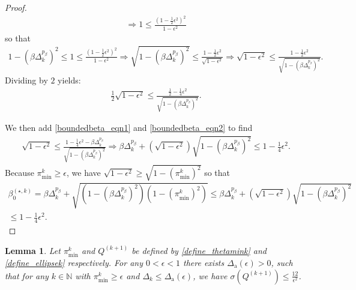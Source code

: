 \documentclass{article}
\newtheorem{lemma}[theorem]{Lemma}
\theoremstyle{case}
\numberwithin{theorem}{subsection}
\newcommand{\bsk}{{\beta_0^{(\star, k)}}}
\newcommand{\dacco}{{\Delta_{\textrm{a}}}}
\newcommand{\dk}{\Delta_k}
\newcommand{\naturals}{\mathbb N}
\newcommand{\thetamink}{{\pi^k_{\textrm{min}}}}
\newcommand{\qkpo}{{Q^{(k+1)}}}
\begin{document}
\begin{proof}
\begin{align*}
\Longrightarrow 1 \le \frac{\left(1 - \frac 1 2 \epsilon^2\right)^2}{1 - \epsilon^2}
\end{align*}
so that
\begin{align*}
1 - \left(\beta\dk^{p_{\beta}}\right)^2 \le 1 \le \frac{\left(1 - \frac 1 2 \epsilon^2\right)^2}{1 - \epsilon^2} 
\Longrightarrow \sqrt{1 - \left(\beta\dk^{p_{\beta}}\right)^2}\le \frac{1 - \frac 1 2 \epsilon^2}{\sqrt{1 - \epsilon^2} } 
\Longrightarrow \sqrt{1 - \epsilon^2} \le \frac{1 - \frac 1 2 \epsilon^2}{\sqrt{1 - \left(\beta\dk^{p_{\beta}}\right)^2}}.
\end{align*}
Dividing by $2$ yields:
\begin{align}
\frac 1 2 \sqrt{1 - \epsilon^2} \le \frac{\frac 1 2 - \frac 1 4 \epsilon^2}{\sqrt{1 - \left(\beta\dk^{p_{\beta}}\right)^2}}
\label{boundedbeta_eqn2}.
\end{align}

We then add \cref{boundedbeta_eqn1} and \cref{boundedbeta_eqn2} to find
\begin{align*}
\sqrt{1 - \epsilon^2} \le \frac{1 -  \frac 1 4 \epsilon^2 - \beta\dk^{p_{\beta}}}{\sqrt{1 - \left(\beta\dk^{p_{\beta}}\right)^2}}
\Longrightarrow \beta\dk^{p_{\beta}} + \left(\sqrt{1 - \epsilon^2}\right)\sqrt{1 - \left(\beta\dk^{p_{\beta}}\right)^2} \le 1 -  \frac 1 4 \epsilon^2.
\end{align*}
Because $\thetamink \ge \epsilon$, we have $\sqrt{1 - \epsilon^2} \ge \sqrt{1 - \left(\thetamink\right)^2}$
so that
\begin{align*}
\bsk 
= \beta\dk^{p_{\beta}} + \sqrt{\left(1 - \left(\beta\dk^{p_{\beta}}\right)^2\right)\left(1 - \left(\thetamink\right)^2\right)} 
\le \beta\dk^{p_{\beta}} + \left(\sqrt{1 - \epsilon^2}\right)\sqrt{1 - \left(\beta\dk^{p_{\beta}}\right)^2} \\
\le 1 -  \frac 1 4 \epsilon^2.
\end{align*}
\end{proof}



\begin{lemma}
\label{boundbeta}
Let $\thetamink$ and $\qkpo$ be defined by \cref{define_thetamink} and \cref{define_ellipsek} respectively.
For any $0 < \epsilon < 1$ there exists $\dacco(\epsilon) > 0$, such that for any $k \in \naturals$ with
$\thetamink \ge \epsilon$ and $\dk \le \dacco(\epsilon)$, we have $\sigma(\qkpo) \le \frac{12}{\epsilon^2}$.
\end{lemma}
\end{document}

